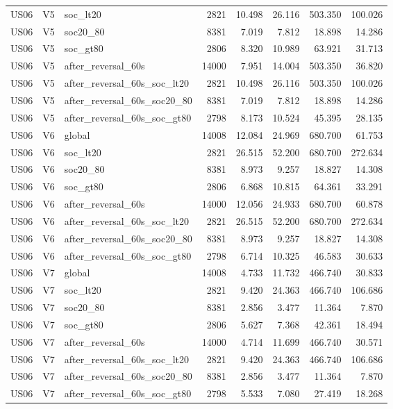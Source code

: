 \begin{tabular}{lllrrrrr}
US06 & V5 & soc\_lt20 & 2821 & 10.498 & 26.116 & 503.350 & 100.026 \\
US06 & V5 & soc20\_80 & 8381 & 7.019 & 7.812 & 18.898 & 14.286 \\
US06 & V5 & soc\_gt80 & 2806 & 8.320 & 10.989 & 63.921 & 31.713 \\
US06 & V5 & after\_reversal\_60s & 14000 & 7.951 & 14.004 & 503.350 & 36.820 \\
US06 & V5 & after\_reversal\_60s\_soc\_lt20 & 2821 & 10.498 & 26.116 & 503.350 & 100.026 \\
US06 & V5 & after\_reversal\_60s\_soc20\_80 & 8381 & 7.019 & 7.812 & 18.898 & 14.286 \\
US06 & V5 & after\_reversal\_60s\_soc\_gt80 & 2798 & 8.173 & 10.524 & 45.395 & 28.135 \\
US06 & V6 & global & 14008 & 12.084 & 24.969 & 680.700 & 61.753 \\
US06 & V6 & soc\_lt20 & 2821 & 26.515 & 52.200 & 680.700 & 272.634 \\
US06 & V6 & soc20\_80 & 8381 & 8.973 & 9.257 & 18.827 & 14.308 \\
US06 & V6 & soc\_gt80 & 2806 & 6.868 & 10.815 & 64.361 & 33.291 \\
US06 & V6 & after\_reversal\_60s & 14000 & 12.056 & 24.933 & 680.700 & 60.878 \\
US06 & V6 & after\_reversal\_60s\_soc\_lt20 & 2821 & 26.515 & 52.200 & 680.700 & 272.634 \\
US06 & V6 & after\_reversal\_60s\_soc20\_80 & 8381 & 8.973 & 9.257 & 18.827 & 14.308 \\
US06 & V6 & after\_reversal\_60s\_soc\_gt80 & 2798 & 6.714 & 10.325 & 46.583 & 30.633 \\
US06 & V7 & global & 14008 & 4.733 & 11.732 & 466.740 & 30.833 \\
US06 & V7 & soc\_lt20 & 2821 & 9.420 & 24.363 & 466.740 & 106.686 \\
US06 & V7 & soc20\_80 & 8381 & 2.856 & 3.477 & 11.364 & 7.870 \\
US06 & V7 & soc\_gt80 & 2806 & 5.627 & 7.368 & 42.361 & 18.494 \\
US06 & V7 & after\_reversal\_60s & 14000 & 4.714 & 11.699 & 466.740 & 30.571 \\
US06 & V7 & after\_reversal\_60s\_soc\_lt20 & 2821 & 9.420 & 24.363 & 466.740 & 106.686 \\
US06 & V7 & after\_reversal\_60s\_soc20\_80 & 8381 & 2.856 & 3.477 & 11.364 & 7.870 \\
US06 & V7 & after\_reversal\_60s\_soc\_gt80 & 2798 & 5.533 & 7.080 & 27.419 & 18.268 \\

\end{tabular}
